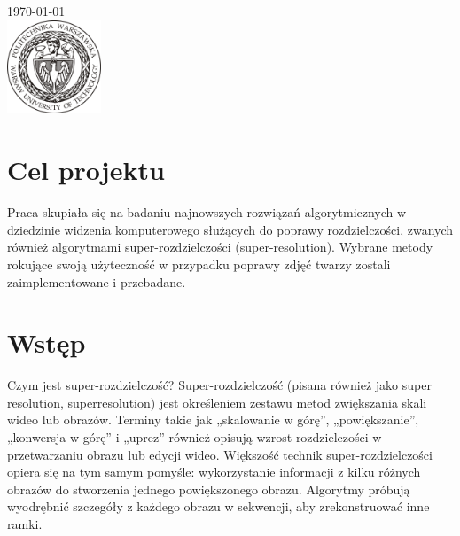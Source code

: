 \documentclass[a4paper,11pt, notitlepage ]{article}
\begin{document}
\begin{titlepage}
		
		
		{\large \today}\\[2cm] %
		
		
		\includegraphics[width = 28mm]{logo.jpg} %
		
		
		\vfill %
		
	\end{titlepage}
	\tableofcontents
	\newpage
	\section{Cel projektu}
	Praca skupiała się na badaniu najnowszych rozwiązań algorytmicznych w dziedzinie widzenia komputerowego służących do poprawy rozdzielczości, zwanych również algorytmami super-rozdzielczości (super-resolution). Wybrane metody rokujące swoją użyteczność w przypadku poprawy zdjęć twarzy zostali  zaimplementowane i przebadane.
	
	\section{Wstęp}
	Czym jest super-rozdzielczość? Super-rozdzielczość (pisana również jako super resolution, superresolution) jest określeniem zestawu metod zwiększania skali wideo lub obrazów. Terminy takie jak „skalowanie w górę”, „powiększanie”, „konwersja w górę” i „uprez” również opisują wzrost rozdzielczości w przetwarzaniu obrazu lub edycji wideo. Większość technik super-rozdzielczości opiera się na tym samym pomyśle: wykorzystanie informacji z kilku różnych obrazów do stworzenia jednego powiększonego obrazu. Algorytmy próbują wyodrębnić szczegóły z każdego obrazu w sekwencji, aby zrekonstruować inne ramki. 
\end{document}
